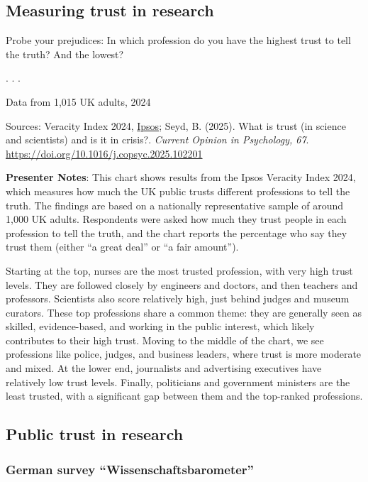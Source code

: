 \documentclass[
  letterpaper,
  DIV=11,
  numbers=noendperiod]{scrartcl}
\begin{document}
\subsection{Measuring trust in
research}\label{measuring-trust-in-research}

 Probe your prejudices: In which profession do you
have the highest trust to tell the truth? And the lowest?

. . .

{Data from 1,015 UK adults, 2024}

Sources: Veracity Index 2024,
\href{https://www.ipsos.com/en\%2Duk/ipsos\%2Dveracity\%2Dindex\%2D2024}{Ipsos};
Seyd, B. (2025). What is trust (in science and scientists) and is it in
crisis?. \emph{Current Opinion in Psychology, 67}.
\url{https://doi.org/10.1016/j.copsyc.2025.102201}

\textbf{Presenter Notes}: This chart shows results from the Ipsos
Veracity Index 2024, which measures how much the UK public trusts
different professions to tell the truth. The findings are based on a
nationally representative sample of around 1,000 UK adults. Respondents
were asked how much they trust people in each profession to tell the
truth, and the chart reports the percentage who say they trust them
(either ``a great deal'' or ``a fair amount'').

Starting at the top, nurses are the most trusted profession, with very
high trust levels. They are followed closely by engineers and doctors,
and then teachers and professors. Scientists also score relatively high,
just behind judges and museum curators. These top professions share a
common theme: they are generally seen as skilled, evidence-based, and
working in the public interest, which likely contributes to their high
trust. Moving to the middle of the chart, we see professions like
police, judges, and business leaders, where trust is more moderate and
mixed. At the lower end, journalists and advertising executives have
relatively low trust levels. Finally, politicians and government
ministers are the least trusted, with a significant gap between them and
the top-ranked professions.

\subsection{Public trust in research}\label{public-trust-in-research}

\subsubsection{German survey
``Wissenschaftsbarometer''}\label{german-survey-wissenschaftsbarometer}
\end{document}
